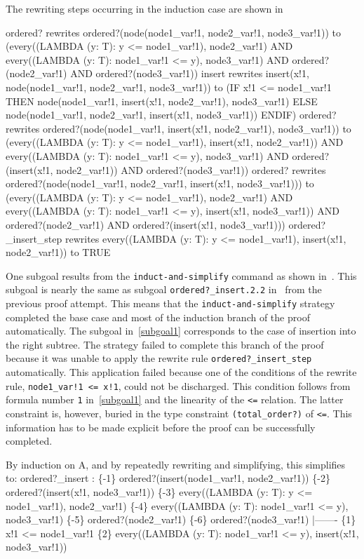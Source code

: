 \documentclass[11pt,twoside]{book}
\newcommand{\pvsref}[1]{\fbox{\footnotesize\ref{#1}}} \def\id#1{\hbox{\textt{#1}}} %
\begin{document}
The rewriting steps occurring in the induction case are shown
in~\pvsref{indcase} 
\begin{session*}\label{indcase}
ordered? rewrites ordered?(node(node1_var!1, node2_var!1, node3_var!1))
  to (every((LAMBDA (y: T): y <= node1_var!1), node2_var!1)
           AND every((LAMBDA (y: T): node1_var!1 <= y), node3_var!1)
             AND ordered?(node2_var!1) AND ordered?(node3_var!1))
insert rewrites insert(x!1, node(node1_var!1, node2_var!1, node3_var!1))
  to (IF x!1 <= node1_var!1
         THEN node(node1_var!1, insert(x!1, node2_var!1), node3_var!1)
       ELSE node(node1_var!1, node2_var!1, insert(x!1, node3_var!1))
       ENDIF)
ordered? rewrites 
  ordered?(node(node1_var!1, insert(x!1, node2_var!1), node3_var!1))
  to (every((LAMBDA (y: T): y <= node1_var!1), insert(x!1, node2_var!1))
           AND every((LAMBDA (y: T): node1_var!1 <= y), node3_var!1)
             AND ordered?(insert(x!1, node2_var!1)) AND ordered?(node3_var!1))
ordered? rewrites 
  ordered?(node(node1_var!1, node2_var!1, insert(x!1, node3_var!1)))
  to (every((LAMBDA (y: T): y <= node1_var!1), node2_var!1)
           AND
         every((LAMBDA (y: T): node1_var!1 <= y), insert(x!1, node3_var!1))
             AND ordered?(node2_var!1) AND ordered?(insert(x!1, node3_var!1)))
ordered?_insert_step rewrites 
  every((LAMBDA (y: T): y <= node1_var!1), insert(x!1, node2_var!1))
  to TRUE
\end{session*}
One subgoal results from the \texttt{induct-and-simplify} command
as shown in~\pvsref{subgoal1}.  This subgoal is nearly the same as
subgoal \texttt{ordered?\_insert.2.2} in~\pvsref{subgoal2.2} from the
previous proof attempt.  This means that the \texttt{induct-and-simplify}
strategy completed the base case and most of the induction branch of the
proof automatically.  The subgoal in~\ref{subgoal1} corresponds to the
case of insertion into the right subtree.  The strategy failed to complete
this branch of the proof because it was unable to apply the rewrite rule
\texttt{ordered?\_insert\_step} automatically.  This application failed
because one of the conditions of the rewrite rule, \texttt{node1\_var!1 <=
x!1}, could not be discharged.  This condition follows from formula number
\texttt{1} in~\ref{subgoal1} and the linearity of the \texttt{<=} relation.
The latter constraint is, however, buried in the type constraint \texttt{(total\_order?)} of \texttt{<=}\@.  This information has to be made explicit
before the proof can be successfully completed.  
\begin{session*}\label{subgoal1}
By induction on A, and by repeatedly rewriting and simplifying,
this simplifies to: 
ordered?_insert :  
\{-1\}   ordered?(insert(node1_var!1, node2_var!1))
\{-2\}   ordered?(insert(x!1, node3_var!1))
\{-3\}   every((LAMBDA (y: T): y <= node1_var!1), node2_var!1)
\{-4\}   every((LAMBDA (y: T): node1_var!1 <= y), node3_var!1)
\{-5\}   ordered?(node2_var!1)
\{-6\}   ordered?(node3_var!1)
  |-------
\{1\}   x!1 <= node1_var!1
\{2\}   every((LAMBDA (y: T): node1_var!1 <= y), insert(x!1, node3_var!1))
\end{session*}
\end{document}

